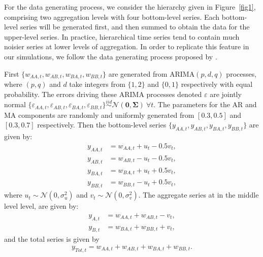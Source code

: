 \documentclass[a4paper, 11pt]{article}
\theoremstyle{theo}
\theoremstyle{definition}
\begin{document}
For  the data generating process, we consider the hierarchy given in Figure~\ref{fig1}, comprising two aggregation levels with four bottom-level series. Each bottom-level series will be generated first, and then summed to obtain the data for the upper-level series. In practice, hierarchical time series tend to contain much noisier series at lower levels of aggregation. In order to replicate this feature in our simulations, we follow the data generating process proposed by \citet{Wickramasuriya2017}.

First $\{w_{AA,t},w_{AB,t},w_{BA,t},w_{BB,t}\}$ are generated from ARIMA$(p,d,q)$ processes, where $(p,q)$ and $d$ take integers from $\{1,2\}$ and $\{0,1\}$ respectively with equal probability. The errors driving these ARIMA processes denoted $\varepsilon$ are jointly normal $\{\varepsilon_{AA,t},\varepsilon_{AB,t},\varepsilon_{BA,t},\varepsilon_{BB,t}\} \overset{iid}{\sim} \mathcal{N}(\bm{0}, \bm{\Sigma})~\forall t$. The parameters for the AR and MA components are randomly and uniformly generated from $[0.3,0.5]$ and $[0.3,0.7]$ respectively. Then the bottom-level series $\{y_{AA,t},y_{AB,t},y_{BA,t},y_{BB,t}\}$ are given by:
\begin{align*}
y_{AA,t} &= w_{AA,t} + u_t - 0.5v_t,\\
y_{AB,t} &= w_{AB,t} - u_t - 0.5v_t,\\
y_{BA,t} &= w_{BA,t} + u_t + 0.5v_t,\\
y_{BB,t} &= w_{BB,t} - u_t + 0.5v_t,
\end{align*}
where $u_t \sim \mathcal{N}(0,\sigma^2_u)$ and $v_t \sim \mathcal{N}(0,\sigma^2_v)$.
The aggregate series at in the middle level level, are given by:
\begin{align*}
y_{A,t} &= w_{AA,t} + w_{AB,t} - v_t,\\
y_{B,t} &= w_{BA,t} + w_{BB,t} + v_t,
\end{align*}
and the total series is given by
$$y_{Tot,t} = w_{AA,t} + w_{AB,t} + w_{BA,t} + w_{BB,t}.$$
\end{document}
